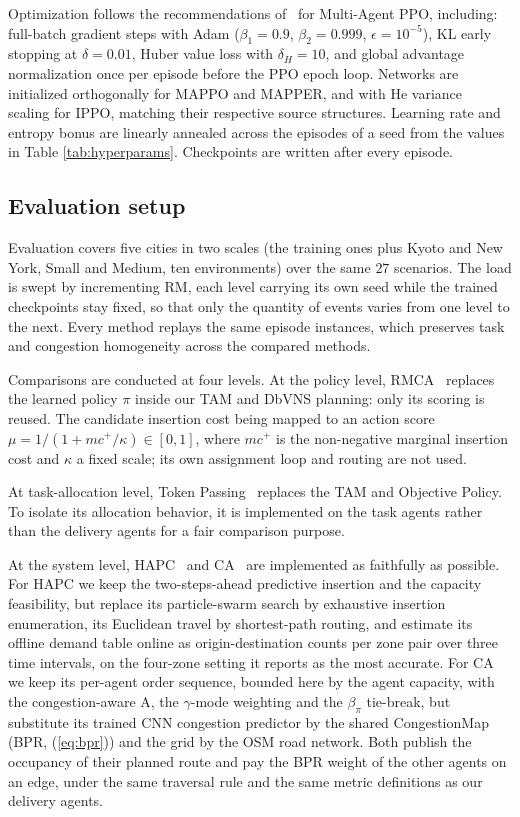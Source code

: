 \documentclass[sigconf]{acmart}
\begin{document}
Optimization follows the recommendations of~\cite{yu2022,dewitt2020} for Multi-Agent PPO, including: full-batch gradient steps with Adam ($\beta_1 = 0.9$, $\beta_2 = 0.999$, $\epsilon = 10^{-5}$), KL early stopping at $\delta = 0.01$, Huber value loss with $\delta_{H} = 10$, and global advantage normalization once per episode before the PPO epoch loop. Networks are initialized orthogonally for MAPPO and MAPPER, and with He variance~\cite{he2015} scaling for IPPO, matching their respective source structures. Learning rate and entropy bonus are linearly annealed across the episodes of a seed from the values in Table \ref{tab:hyperparams}. Checkpoints are written after every episode.

\subsection{Evaluation setup}

Evaluation covers five cities in two scales (the training ones plus Kyoto and New York, Small and Medium, ten environments) over the same $27$ scenarios. The load is swept by incrementing $\mathrm{RM}$, each level carrying its own seed while the trained checkpoints stay fixed, so that only the quantity of events varies from one level to the next. Every method replays the same episode instances, which preserves task and congestion homogeneity across the compared methods.

Comparisons are conducted at four levels. At the policy level, RMCA~\cite{chen2021} replaces the learned policy $\pi$ inside our TAM and DbVNS planning: only its scoring is reused. The candidate insertion cost being mapped to an action score $\mu = 1/\!\left(1 + mc^{+}/\kappa\right) \in [0,1]$, where $mc^{+}$ is the non-negative marginal insertion cost and $\kappa$ a fixed scale; its own assignment loop and routing are not used.

At task-allocation level, Token Passing~\cite{ma2017} replaces the TAM and Objective Policy. To isolate its allocation behavior, it is implemented on the task agents rather than the delivery agents for a fair comparison purpose.

At the system level, HAPC~\cite{cortes2009} and CA~\cite{asadi2025} are implemented as faithfully as possible. For HAPC we keep the two-steps-ahead predictive insertion and the capacity feasibility, but replace its particle-swarm search by exhaustive insertion enumeration, its Euclidean travel by shortest-path routing, and estimate its offline demand table online as origin-destination counts per zone pair over three time intervals, on the four-zone setting it reports as the most accurate. For CA we keep its per-agent order sequence, bounded here by the agent capacity, with the congestion-aware A\*, the $\gamma$-mode weighting and the $\beta_\pi$ tie-break, but substitute its trained CNN congestion predictor by the shared CongestionMap (BPR, (\ref{eq:bpr})) and the grid by the OSM road network. Both publish the occupancy of their planned route and pay the BPR weight of the other agents on an edge, under the same traversal rule and the same metric definitions as our delivery agents.
\end{document}
